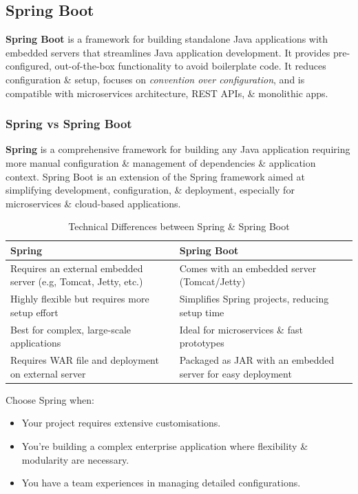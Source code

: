 \documentclass[a4paper,11pt]{article}
\begin{document}
\subsection{Spring Boot}
\textbf{Spring Boot} is a framework for building standalone Java applications with embedded servers that streamlines Java
application development.
It provides pre-configured, out-of-the-box functionality to avoid boilerplate code.
It reduces configuration \& setup, focuses on \textit{convention over configuration}, and is compatible with microservices
architecture, REST APIs, \& monolithic apps.

\subsubsection{Spring vs Spring Boot}
\textbf{Spring} is a comprehensive framework for building any Java application requiring more manual configuration \& 
management of dependencies \& application context.
Spring Boot is an extension of the Spring framework aimed at simplifying development, configuration, \& deployment, 
especially for microservices \& cloud-based applications.

\begin{table}[h!]
    \centering

    \begin{tabular}{|>{\arraybackslash}p{}|>{\arraybackslash}p{}|}
        \hline
        \textbf{Spring}                                                 & \textbf{Spring Boot} \\
        \hline
        Requires an external embedded server (e.g, Tomcat, Jetty, etc.) & Comes with an embedded server (Tomcat/Jetty)\\
        \hline
        Highly flexible but requires more setup effort                  & Simplifies Spring projects, reducing setup time \\
        \hline
        Best for complex, large-scale applications                      & Ideal for microservices \& fast prototypes \\
        \hline
        Requires WAR file and deployment on external server             & Packaged as JAR with an embedded server for easy deployment \\
        \hline
    \end{tabular}
    \caption{Technical Differences between Spring \& Spring Boot}
\end{table}

Choose Spring when:
\begin{itemize}
    \item   Your project requires extensive customisations.
    \item   You're building a complex enterprise application where flexibility \& modularity are necessary.
    \item   You have a team experiences in managing detailed configurations.
\end{itemize}
\end{document}

